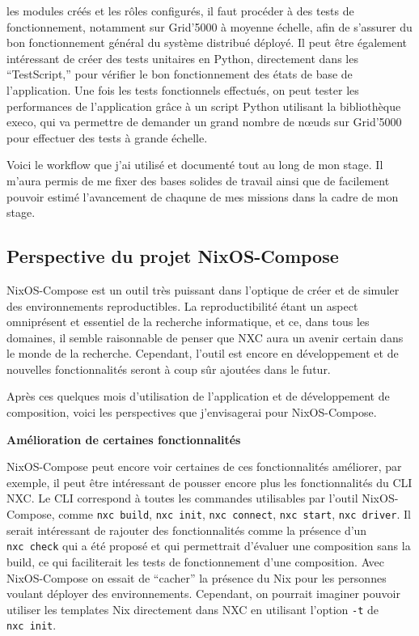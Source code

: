 \documentclass[a4paper,french,12pt, titlepage]{article}
\begin{document}
\begin{itemize}
  les modules créés et les rôles configurés, il faut procéder à des
  tests de fonctionnement, notamment sur Grid'5000 à moyenne échelle,
  afin de s'assurer du bon fonctionnement général du système distribué
  déployé. Il peut être également intéressant de créer des tests
  unitaires en Python, directement dans les ``TestScript,'' pour
  vérifier le bon fonctionnement des états de base de l'application. Une
  fois les tests fonctionnels effectués, on peut tester les performances
  de l'application grâce à un script Python utilisant la bibliothèque
  execo, qui va permettre de demander un grand nombre de nœuds sur
  Grid'5000 pour effectuer des tests à grande échelle.\newline
\end{itemize}

Voici le workflow que j'ai utilisé et documenté tout au long de mon
stage. Il m'aura permis de me fixer des bases solides de travail ainsi
que de facilement pouvoir estimé l'avancement de chaqune de mes missions
dans la cadre de mon stage.

\newpage

\hypertarget{perspective-du-projet-nixos-compose}{%
\subsection{Perspective du projet
NixOS-Compose}\label{perspective-du-projet-nixos-compose}}

NixOS-Compose est un outil très puissant dans l'optique de créer et de
simuler des environnements reproductibles. La reproductibilité étant un
aspect omniprésent et essentiel de la recherche informatique, et ce,
dans tous les domaines, il semble raisonnable de penser que NXC aura un
avenir certain dans le monde de la recherche. Cependant, l'outil est
encore en développement et de nouvelles fonctionnalités seront à coup
sûr ajoutées dans le futur.

Après ces quelques mois d'utilisation de l'application et de
développement de composition, voici les perspectives que j'envisagerai
pour NixOS-Compose.\newline

\textbf{Amélioration de certaines fonctionnalités}\newline

NixOS-Compose peut encore voir certaines de ces fonctionnalités
améliorer, par exemple, il peut être intéressant de pousser encore plus
les fonctionnalités du CLI NXC. Le CLI correspond à toutes les commandes
utilisables par l'outil NixOS-Compose, comme \texttt{nxc\ build},
\texttt{nxc\ init}, \texttt{nxc\ connect}, \texttt{nxc\ start},
\texttt{nxc\ driver}. Il serait intéressant de rajouter des
fonctionnalités comme la présence d'un \texttt{nxc\ check} qui a été
proposé et qui permettrait d'évaluer une composition sans la build, ce
qui faciliterait les tests de fonctionnement d'une composition. Avec
NixOS-Compose on essait de ``cacher'' la présence du Nix pour les
personnes voulant déployer des environnements. Cependant, on pourrait
imaginer pouvoir utiliser les templates Nix directement dans NXC en
utilisant l'option \texttt{-t} de \texttt{nxc\ init}.\newline
\end{document}
